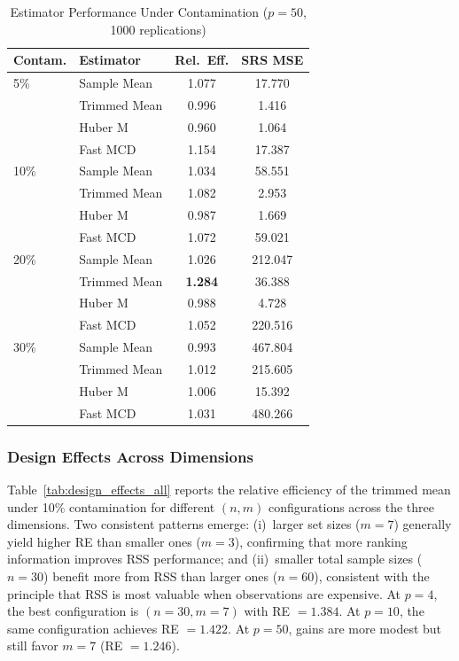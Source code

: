 \documentclass[12pt]{article}
\begin{document}
\begin{table}[htbp]
\centering
\caption{Estimator Performance Under Contamination ($p = 50$, 1000 replications)}
\label{tab:contam_p50_new}
\begin{tabular}{llcc}
\toprule
Contam. & Estimator & Rel.\ Eff. & SRS MSE \\
\midrule
5\% & Sample Mean & 1.077 & 17.770 \\
& Trimmed Mean & 0.996 & 1.416 \\
& Huber M & 0.960 & 1.064 \\
& Fast MCD & 1.154 & 17.387 \\
\midrule
10\% & Sample Mean & 1.034 & 58.551 \\
& Trimmed Mean & 1.082 & 2.953 \\
& Huber M & 0.987 & 1.669 \\
& Fast MCD & 1.072 & 59.021 \\
\midrule
20\% & Sample Mean & 1.026 & 212.047 \\
& Trimmed Mean & \textbf{1.284} & 36.388 \\
& Huber M & 0.988 & 4.728 \\
& Fast MCD & 1.052 & 220.516 \\
\midrule
30\% & Sample Mean & 0.993 & 467.804 \\
& Trimmed Mean & 1.012 & 215.605 \\
& Huber M & 1.006 & 15.392 \\
& Fast MCD & 1.031 & 480.266 \\
\bottomrule
\end{tabular}
\end{table}

\subsubsection{Design Effects Across Dimensions}

Table~\ref{tab:design_effects_all} reports the relative efficiency of the trimmed mean under 10\% contamination for different $(n, m)$ configurations across the three dimensions. Two consistent patterns emerge: (i)~larger set sizes ($m = 7$) generally yield higher RE than smaller ones ($m = 3$), confirming that more ranking information improves RSS performance; and (ii)~smaller total sample sizes ($n = 30$) benefit more from RSS than larger ones ($n = 60$), consistent with the principle that RSS is most valuable when observations are expensive. At $p = 4$, the best configuration is $(n = 30, m = 7)$ with RE $= 1.384$. At $p = 10$, the same configuration achieves RE $= 1.422$. At $p = 50$, gains are more modest but still favor $m = 7$ (RE $= 1.246$).
\end{document}
